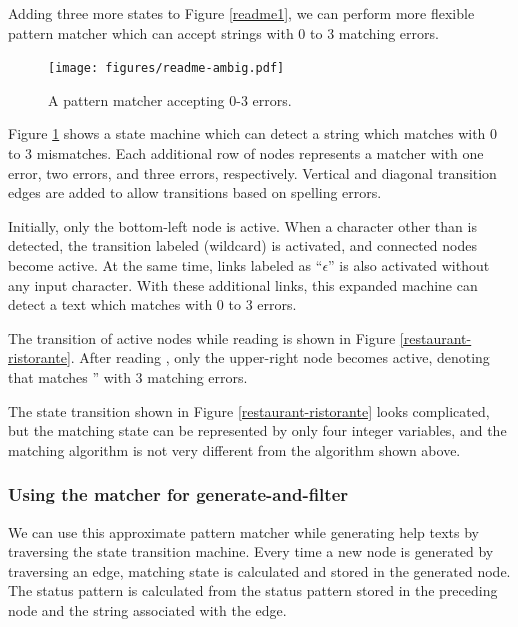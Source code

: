 \documentclass{sigchi}
\begin{document}
Adding three more states to Figure \ref{readme1}, we can perform more
flexible pattern matcher which can accept strings with
0 to 3 matching errors.

\begin{figure}[htb]
  \texttt{[image: figures/readme-ambig.pdf]}
  \caption{A pattern matcher accepting 0-3 errors.}
  \label{shifterambig}
\end{figure}

Figure \ref{shifterambig} shows a state machine which can detect a string
which matches  with 0 to 3 mismatches.
Each additional row of nodes represents a matcher with one error,
two errors, and three errors, respectively.
Vertical and diagonal transition edges are added to allow
transitions based on spelling errors.

Initially, only the bottom-left node is active.
When a character other than  is detected, 
the transition labeled \sqsf{*} (wildcard) is activated,
and connected nodes become active.
At the same time, links labeled as ``$\epsilon$''
is also activated without any input character.
With these additional links, this expanded machine can detect a text which
matches  with 0 to 3 errors.


The transition of active nodes while reading
 is shown in Figure \ref{restaurant-ristorante}.
After reading ,
only the upper-right node becomes active,
denoting that  matches
'' with 3 matching errors.

The state transition shown in 
Figure \ref{restaurant-ristorante} looks complicated, but
the matching state can be represented by only four integer variables, and
the matching algorithm is not very different from the algorithm
shown above.

\subsubsection{Using the matcher for generate-and-filter}

We can use this approximate pattern matcher while generating
help texts by traversing the state transition machine.
%
Every time a new node is generated by traversing an edge,
matching state is calculated and stored in the generated node.
The status pattern is calculated from the status pattern
stored in the preceding node and the string associated with the edge.
\end{document}

